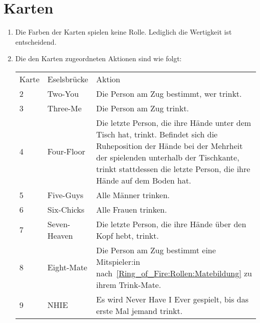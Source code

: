 \section{Karten}\label{Ring_of_Fire:Karten}
\begin{enumerate}[label={(\arabic*)}]
	\item
	Die Farben der Karten spielen keine Rolle. Lediglich die Wertigkeit ist entscheidend.
	
	\item\label{Ring_of_Fire:Karten:Tabelle}
	Die den Karten zugeordneten Aktionen sind wie folgt:


	\begin{tabulary}{\textwidth}{llL} %
		\toprule
		Karte & Eselsbrücke & Aktion \\
		2  & Two-You        & Die Person am Zug bestimmt, wer trinkt.                                                                                                              \\[1ex]
		3  & Three-Me       & Die Person am Zug trinkt.                                                                                                                            \\[1ex]
		4  & Four-Floor     & Die letzte Person, die ihre Hände unter dem Tisch hat, trinkt.
		Befindet sich die Ruheposition der Hände bei der Mehrheit der spielenden unterhalb der Tischkante, trinkt stattdessen die letzte Person, die ihre Hände auf dem Boden hat. \\[1ex]
		5  & Five-Guys      & Alle Männer trinken.                                                                                                                                 \\[1ex]
		6  & Six-Chicks     & Alle Frauen trinken.                                                                                                                                 \\[1ex]
		7  & Seven-Heaven   & Die letzte Person, die ihre Hände über den Kopf hebt, trinkt.                                                                                        \\[1ex]
		8  & Eight-Mate     & Die Person am Zug bestimmt eine Mitspieler:in nach~\ref{Ring_of_Fire:Rollen:Matebildung} zu ihrem Trink-Mate.                                                                                   \\[1ex]
		9  & NHIE           & Es wird \glqq{}Never Have I Ever\grqq{} gespielt, bis das erste Mal jemand trinkt.                                                                    \\[1ex]

\end{tabulary}
\end{enumerate}
